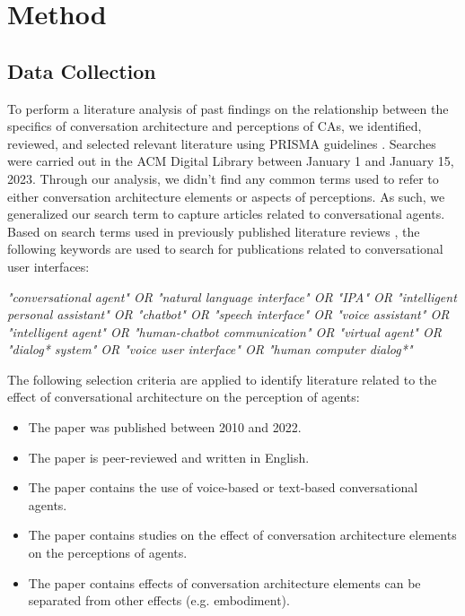 
\section{Method}


\subsection{Data Collection}
To perform a literature analysis of past findings on the relationship between the specifics of conversation architecture and perceptions of CAs, we identified, reviewed, and selected relevant literature using PRISMA guidelines \cite{prisma}. %
Searches were carried out in the ACM Digital Library between January 1 and January 15, 2023. Through our analysis, we didn't find any common terms used to refer to either conversation architecture elements or aspects of perceptions. As such, we generalized our search term to capture articles related to conversational agents. Based on search terms used in previously published literature reviews \cite{clark2019state, rapp2021human}, the following keywords are used to search for publications related to conversational user interfaces:
\newline

\textit{"conversational agent" OR "natural language interface" OR "IPA" OR "intelligent personal assistant" OR "chatbot" OR "speech interface" OR "voice assistant" OR "intelligent agent" OR "human-chatbot communication" OR "virtual agent" OR "dialog* system" OR "voice user interface" OR "human computer dialog*"}
\newline

The following selection criteria are applied to identify literature related to the effect of conversational architecture on the perception of agents:
\begin{itemize}
  \item The paper was published between 2010 and 2022.
  \item The paper is peer-reviewed and written in English.
  \item The paper contains the use of voice-based or text-based conversational agents.
  \item The paper contains studies on the effect of conversation architecture elements on the perceptions of agents.
  \item The paper contains effects of conversation architecture elements can be separated from other effects (e.g. embodiment).

\end{itemize}

